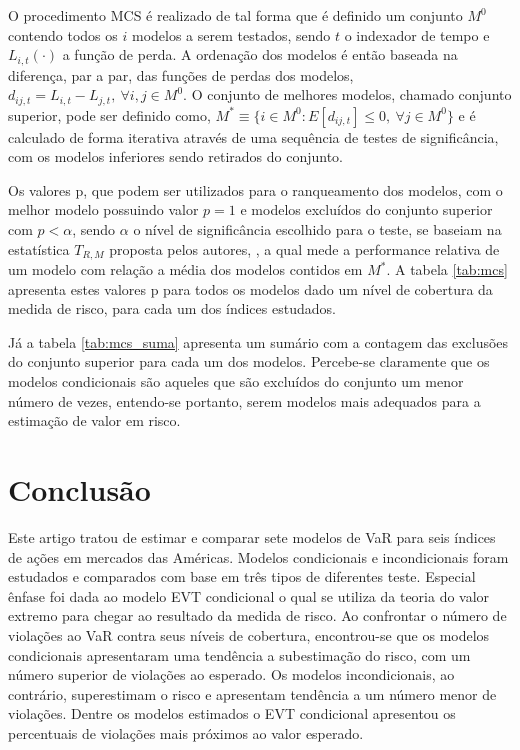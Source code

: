 \documentclass[review]{elsarticle}
\theoremstyle{definition}
\begin{document}
O procedimento MCS é realizado de tal forma que é definido um conjunto $M^0$ contendo todos os $i$ modelos a serem testados, sendo $t$ o indexador de tempo e $L_{i, t}(\cdot)$ a função de perda. A ordenação dos modelos é então baseada na diferença, par a par, das funções de perdas dos modelos, $d_{ij, t} = L_{i, t}-L_{j, t}, \ \forall i,j \in M^0$. O conjunto de melhores modelos, chamado conjunto superior, pode ser definido como, $M^\ast \equiv \{i \in M^0 : E[d_{ij,t}] \leq 0, \ \forall j \in M^0\}$ e é calculado de forma iterativa através de uma sequência de testes de significância, com os modelos inferiores sendo retirados do conjunto.

Os valores p, que podem ser utilizados para o ranqueamento dos modelos, com o melhor modelo possuindo valor $p=1$ e modelos excluídos do conjunto superior com $p<\alpha$, sendo $\alpha$ o nível de significância escolhido para o teste, se baseiam na estatística $T_{R, M}$ proposta pelos autores, \cite{Hansen2011}, a qual mede a performance relativa de um modelo com relação a média dos modelos contidos em $M^\ast$. A tabela \ref{tab:mcs} apresenta estes valores p para todos os modelos dado um nível de cobertura da medida de risco, para cada um dos índices estudados.





Já a tabela \ref{tab:mcs_suma} apresenta um sumário com a contagem das exclusões do conjunto superior para cada um dos modelos. Percebe-se claramente que os modelos condicionais são aqueles que são excluídos do conjunto um menor número de vezes, entendo-se portanto, serem modelos mais adequados para a estimação de valor em risco.

\section{Conclusão}

Este artigo tratou de estimar e comparar sete modelos de VaR para seis índices de ações em mercados das Américas. Modelos condicionais e incondicionais foram estudados e comparados com base em três tipos de diferentes teste. Especial ênfase foi dada ao modelo EVT condicional o qual se utiliza da teoria do valor extremo para chegar ao resultado da medida de risco. Ao confrontar o número de violações ao VaR contra seus níveis de cobertura, encontrou-se que os modelos condicionais apresentaram uma tendência a subestimação do risco, com um número superior de violações ao esperado. Os modelos incondicionais, ao contrário, superestimam o risco e apresentam tendência a um número menor de violações. Dentre os modelos estimados o EVT condicional apresentou os percentuais de violações mais próximos ao valor esperado.
\end{document}
